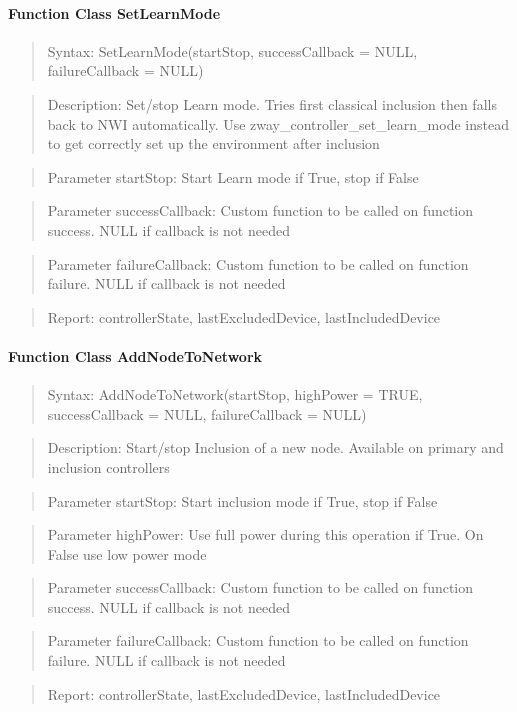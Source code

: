 \paragraph{Function Class SetLearnMode}
\begin{quote}Syntax: SetLearnMode(startStop, successCallback = NULL, failureCallback = NULL)\end{quote}
\begin{quote}Description: Set/stop Learn mode. Tries first classical inclusion then falls back to NWI automatically. Use zway\_controller\_set\_learn\_mode instead to get correctly set up the environment after inclusion\end{quote}
\begin{quote}Parameter startStop: Start Learn mode if True, stop if False\end{quote}
\begin{quote}Parameter successCallback: Custom function to be called on function success. NULL if callback is not needed\end{quote}
\begin{quote}Parameter failureCallback: Custom function to be called on function failure. NULL if callback is not needed\end{quote}
\begin{quote}Report: controllerState, lastExcludedDevice, lastIncludedDevice\end{quote}

\paragraph{Function Class AddNodeToNetwork}
\begin{quote}Syntax: AddNodeToNetwork(startStop, highPower = TRUE, successCallback = NULL, failureCallback = NULL)\end{quote}
\begin{quote}Description: Start/stop Inclusion of a new node. Available on primary and inclusion controllers\end{quote}
\begin{quote}Parameter startStop: Start inclusion mode if True, stop if False\end{quote}
\begin{quote}Parameter highPower: Use full power during this operation if True. On False use low power mode\end{quote}
\begin{quote}Parameter successCallback: Custom function to be called on function success. NULL if callback is not needed\end{quote}
\begin{quote}Parameter failureCallback: Custom function to be called on function failure. NULL if callback is not needed\end{quote}
\begin{quote}Report: controllerState, lastExcludedDevice, lastIncludedDevice\end{quote}

